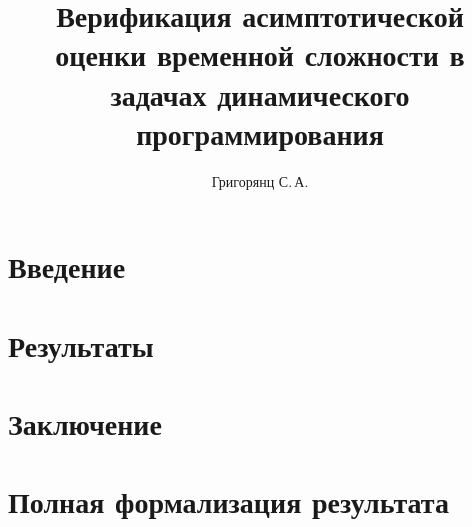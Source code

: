 \documentclass{mipt-thesis-bs}
\title{Верификация асимптотической оценки временной сложности в задачах динамического программирования}
\author{Григорянц С.\,А.}
\begin{document}
\newtheorem{lemma}{Лемма}[section]
\newtheorem{corollary}{Следствие}[section]
\newtheorem{proposition}{Утверждение}[section]
\newtheorem{remark}{Замечание}[section]
\newtheorem{fact}{Факт}[section]
\newtheorem{example}{Пример}[section]
\newtheorem{definition}{Определение}[section]

{\topsep}{\topsep}%
{\itshape}{}%
{\bfseries}{}%
{\newline}{}%
\theoremstyle{break}
\newtheorem{theorem}{Теорема}[section]


\frontmatter
\titlecontents

\mainmatter


\chapter{Введение}


% 

\chapter{Результаты}


\chapter{Заключение}


\chapter{Полная формализация результата}



\backmatter

\printbib


\end{document}
